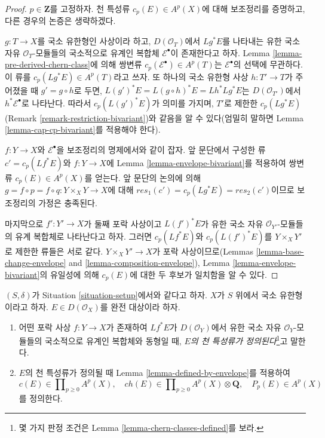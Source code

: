 \begin{proof}
$p \in \mathbf{Z}$를 고정하자. 천 특성류
$c_p(E) \in A^p(X)$에 대해 보조정리를 증명하고, 다른 경우의 논증은
생략하겠다.

\medskip\noindent
$g : T \to X$를 국소 유한형인 사상이라 하고, $D(\mathcal{O}_T)$에서
$Lg^*E$를 나타내는 유한 국소 자유 $\mathcal{O}_T$-모듈들의
국소적으로 유계인 복합체 $\mathcal{E}^\bullet$이 존재한다고 하자.
Lemma \ref{lemma-pre-derived-chern-class}에 의해 쌍변류
$c_p(\mathcal{E}^\bullet) \in A^p(T)$는
$\mathcal{E}^\bullet$의 선택에 무관하다.
이 류를 $c_p(Lg^*E) \in A^p(T)$라고 쓰자.
또 하나의 국소 유한형 사상 $h : T' \to T$가 주어졌을 때
$g' = g \circ h$로 두면,
$L(g')^*E = L(g \circ h)^*E = Lh^*Lg^*E$는
$D(\mathcal{O}_{T'})$에서 $h^*\mathcal{E}^\bullet$로 나타난다.
따라서 $c_p(L(g')^*E)$가 의미를 가지며, $T'$로 제한한
$c_p(Lg^*E)$ (Remark \ref{remark-restriction-bivariant})와 같음을
알 수 있다(엄밀히 말하면 Lemma
\ref{lemma-cap-cp-bivariant}를 적용해야 한다).

\medskip\noindent
$f : Y \to X$와 $\mathcal{E}^\bullet$을 보조정리의 명제에서와 같이
잡자. 앞 문단에서 구성한 류 $c' = c_p(Lf^*E)$와
$f : Y \to X$에 Lemma \ref{lemma-envelope-bivariant}를 적용하여
쌍변류 $c_p(E) \in A^p(X)$를 얻는다. 앞 문단의 논의에 의해
$g = f \circ p = f \circ q : Y \times_X Y \to X$에 대해
$res_1(c') = c_p(Lg^*E) = res_2(c')$이므로 보조정리의 가정은
충족된다.

\medskip\noindent
마지막으로 $f' : Y' \to X$가 둘째 포락 사상이고
$L(f')^*E$가 유한 국소 자유 $\mathcal{O}_{Y'}$-모듈들의 유계
복합체로 나타난다고 하자. 그러면 $c_p(Lf^*E)$와
$c_p(L(f')^*E)$를 $Y \times_X Y'$로 제한한 류들은 서로 같다.
$Y \times_X Y' \to X$가 포락 사상이므로(Lemmas
\ref{lemma-base-change-envelope} and
\ref{lemma-composition-envelope}), Lemma
\ref{lemma-envelope-bivariant}의 유일성에 의해 $c_p(E)$에 대한
두 후보가 일치함을 알 수 있다.
\end{proof}

\begin{definition}
\label{definition-defined-on-perfect}
$(S, \delta)$가 Situation \ref{situation-setup}에서와 같다고 하자.
$X$가 $S$ 위에서 국소 유한형이라고 하자.
$E \in D(\mathcal{O}_X)$를 완전 대상이라 하자.
\begin{enumerate}
\item 어떤 포락 사상 $f : Y \to X$가 존재하여 $Lf^*E$가
$D(\mathcal{O}_Y)$에서 유한 국소 자유 $\mathcal{O}_Y$-모듈들의
국소적으로 유계인 복합체와 동형일 때,
{\it $E$의 천 특성류가 정의된다}\footnote{몇 가지 판정 조건은
Lemma \ref{lemma-chern-classes-defined}를 보라.}고 말한다.
\item $E$의 천 특성류가 정의될 때 Lemma
\ref{lemma-defined-by-envelope}를 적용하여
$$
c(E) \in \prod\nolimits_{p \geq 0} A^p(X),\quad
ch(E) \in
\prod\nolimits_{p \geq 0} A^p(X) \otimes \mathbf{Q},\quad
P_p(E) \in A^p(X)
$$
를 정의한다.
\end{enumerate}
\end{definition}

